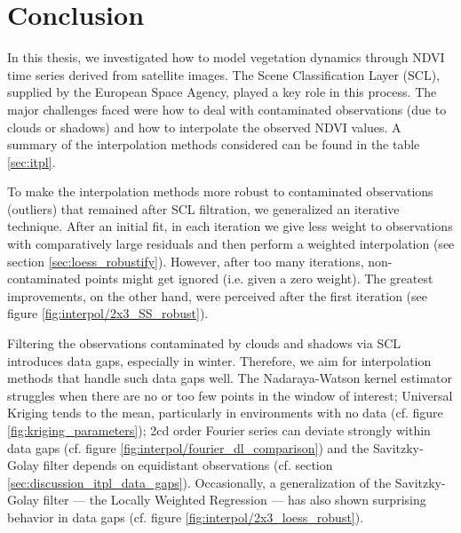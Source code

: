 \chapter{Conclusion}
\label{sec:Conclusion}


    In this thesis, we investigated how to model vegetation dynamics through NDVI time series derived from satellite images. The Scene Classification Layer (SCL), supplied by the European Space Agency, played a key role in this process. The major challenges faced were how to deal with contaminated observations (due to clouds or shadows) and how to interpolate the observed NDVI values. 
    A summary of the interpolation methods considered can be found in the table \ref{sec:itpl}. 
    
    To make the interpolation methods more robust to contaminated observations (outliers) that remained after SCL filtration, we generalized an iterative technique. After an initial fit, in each iteration we give less weight to observations with comparatively large residuals and then perform a weighted interpolation (see section \ref{sec:loess_robustify}). However, after too many iterations, non-contaminated points might get ignored (i.e. given a zero weight). The greatest improvements, on the other hand, were perceived after the first iteration (see figure \ref{fig:interpol/2x3_SS_robust}). 
    
    Filtering the observations contaminated by clouds and shadows via SCL introduces data gaps, especially in winter. Therefore, we aim for interpolation methods that handle such data gaps well. The Nadaraya-Watson kernel estimator struggles when there are no or too few points in the window of interest; Universal Kriging tends to the mean, particularly in environments with no data (cf. figure \ref{fig:kriging_parameters}); 2cd order Fourier series can deviate strongly within data gaps (cf. figure \ref{fig:interpol/fourier_dl_comparison}) and the Savitzky-Golay filter depends on equidistant observations (cf. section \ref{sec:discussion_itpl_data_gaps}). Occasionally, a generalization of the Savitzky-Golay filter --- the Locally Weighted Regression --- has also shown surprising behavior in data gaps (cf. figure \ref{fig:interpol/2x3_loess_robust}).
    
